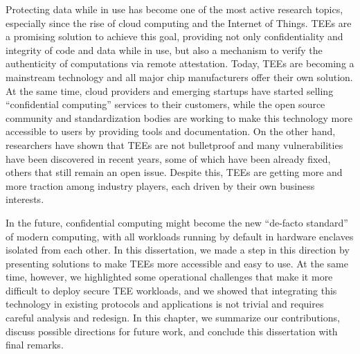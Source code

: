 Protecting data while in use has become one of the most active research topics,
especially since the rise of cloud computing and the Internet of Things.
\acp{TEE} are a promising solution to achieve this goal, providing not only
confidentiality and integrity of code and data while in use, but also a
mechanism to verify the authenticity of computations via remote attestation.
Today, \acp{TEE} are becoming a mainstream technology and all major chip
manufacturers offer their own solution. At the same time, cloud providers and
emerging startups have started selling ``confidential computing'' services to
their customers, while the open source community and standardization bodies are
working to make this technology more accessible to users by providing tools and
documentation. On the other hand, researchers have shown that \acp{TEE} are not
bulletproof and many vulnerabilities have been discovered in recent years, some
of which have been already fixed, others that still remain an open issue.
Despite this, \acp{TEE} are getting more and more traction among industry
players, each driven by their own business interests.

In the future, confidential computing might become the new ``de-facto standard''
of modern computing, with all workloads running by default in hardware enclaves
isolated from each other. In this dissertation, we made a step in this direction
by presenting solutions to make \acp{TEE} more accessible and easy to use. At
the same time, however, we highlighted some operational challenges that make it
more difficult to deploy secure \ac{TEE} workloads, and we showed that
integrating this technology in existing protocols and applications is not
trivial and requires careful analysis and redesign. In this chapter, we
summarize our contributions, discuss possible directions for future work, and
conclude this dissertation with final remarks.